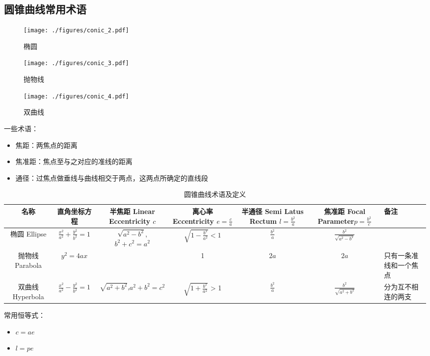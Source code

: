 \subsection{圆锥曲线常用术语}

\begin{figure}[ht]
\centering
\texttt{[image: ./figures/conic\_2.pdf]}
\caption{椭圆} \label{conic_fig2}
\end{figure}

\begin{figure}[ht]
\centering
\texttt{[image: ./figures/conic\_3.pdf]}
\caption{抛物线} \label{conic_fig3}
\end{figure}

\begin{figure}[ht]
\centering
\texttt{[image: ./figures/conic\_4.pdf]}
\caption{双曲线} \label{conic_fig4}
\end{figure}

一些术语：
\begin{itemize}
\item 焦距：两焦点的距离
\item 焦准距：焦点至与之对应的准线的距离
\item 通径：过焦点做垂线与曲线相交于两点，这两点所确定的直线段
\end{itemize}

\begin{table}[ht]
\centering
\caption{圆锥曲线术语及定义}\label{conic_tab1}
\begin{tabular}{|c|c|c|c|c|c|}
\hline
名称 & 直角坐标方程 & 半焦距 Linear Eccentricity $c$ & 离心率 Eccentricity $e = \frac{c}{a}$ & 半通径 Semi Latus Rectum $l=\frac{b^2}{a}$ & 焦准距 Focal Parameter$p=\frac{b^2}{c}$ & 备注\\
\hline
椭圆 Ellipse & $\frac{x^2}{a^2} + \frac{y^2}{b^2} = 1$ & $\sqrt{a^2-b^2}$, $b^2+c^2=a^2$ & $\sqrt{1-\frac{b^2}{a^2}} < 1$ & $\frac{b^2}{a}$ & $\frac{b^2}{\sqrt{a^2-b^2}}$ &  \\
\hline
抛物线 Parabola & $y^2=4ax$ & \ & 1 & $2a$ & $2a$ & 只有一条准线和一个焦点\\
\hline
双曲线 Hyperbola & $\frac{x^2}{a^2} - \frac{y^2}{b^2} = 1$ & $\sqrt{a^2+b^2}$,$a^2+b^2=c^2$ & $\sqrt{1+\frac{b^2}{a^2}}$ > 1 & $\frac{b^2}{a}$ & $\frac{b^2}{\sqrt{a^2+b^2}}$ & 分为互不相连的两支 \\
\hline
\end{tabular}
\end{table}

常用恒等式：
\begin{itemize}
\item $c=ae$
\item $l=pe$
\end{itemize}
